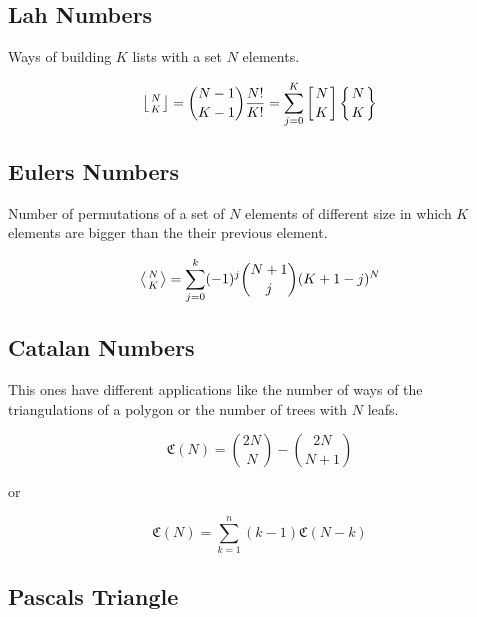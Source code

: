 \subsection{Lah Numbers}

Ways of building \(K\) lists with a set \(N\) elements.

\[\left\lfloor \begin{matrix} N \atop K \end{matrix}\right\rfloor  = \binom{N - 1}{K - 1}\frac{N!}{K!} = \sum_{j=0}^{K}\left[N \atop K\right]\left\{N \atop K\right\}\]

\subsection{Eulers Numbers}

Number of permutations of a set of \(N\) elements of different size in which
\(K\) elements are bigger than the their previous element.

\[\left\langle \begin{matrix} N \atop K \end{matrix}\right\rangle = \sum_{j = 0}^{k}(-1)^j \binom{N + 1}{j}(K +1 -j)^N\]

\subsection{Catalan Numbers}

This ones have different applications like the number of ways of the triangulations of
a polygon or the number of trees with \(N\) leafs.

\[\mathfrak{C}(N) = \binom{2N}{N} - \binom{2N}{N + 1}\]

or

\[\mathfrak{C}(N) = \sum_{k=1}^{n}(k - 1) \mathfrak{C}(N - k)\]

\subsection{Pascals Triangle}

